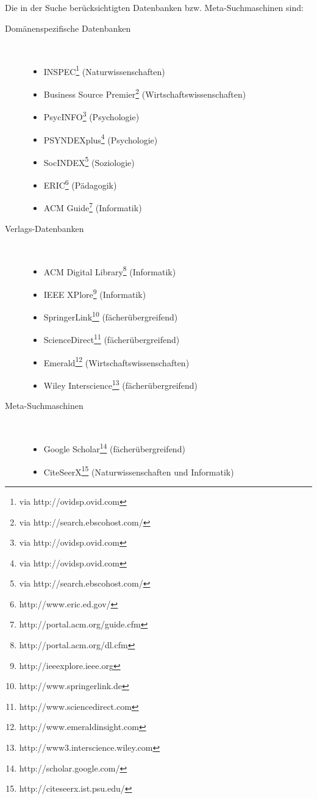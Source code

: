 Die in der Suche berücksichtigten Datenbanken bzw. Meta-Suchmaschinen sind:
\begin{description}
	\item[Domänenspezifische Datenbanken]\ 
		\begin{itemize}
			\item INSPEC\footnote{via http://ovidsp.ovid.com} (Naturwissenschaften)
			\item Business Source Premier\footnote{via http://search.ebscohost.com/} (Wirtschaftswissenschaften)
			\item PsycINFO\footnote{via http://ovidsp.ovid.com} (Psychologie)
			\item PSYNDEXplus\footnote{via http://ovidsp.ovid.com} (Psychologie)
			\item SocINDEX\footnote{via http://search.ebscohost.com/} (Soziologie)
			\item ERIC\footnote{http://www.eric.ed.gov/} (Pädagogik)
			\item ACM Guide\footnote{http://portal.acm.org/guide.cfm} (Informatik)
		\end{itemize}
	\item[Verlags-Datenbanken]\ 
		\begin{itemize}
			\item ACM Digital Library\footnote{http://portal.acm.org/dl.cfm} (Informatik)
			\item IEEE XPlore\footnote{http://ieeexplore.ieee.org} (Informatik)
			\item SpringerLink\footnote{http://www.springerlink.de} (fächerübergreifend)
			\item ScienceDirect\footnote{http://www.sciencedirect.com} (fächerübergreifend)
			\item Emerald\footnote{http://www.emeraldinsight.com} (Wirtschaftswissenschaften)
			\item Wiley Interscience\footnote{http://www3.interscience.wiley.com} (fächerübergreifend)
		\end{itemize}
	\item[Meta-Suchmaschinen]\ 
	 	\begin{itemize}
	 		\item Google Scholar\footnote{http://scholar.google.com/} (fächerübergreifend)
	 		\item CiteSeerX\footnote{http://citeseerx.ist.psu.edu/} (Naturwissenschaften und Informatik)
	 	\end{itemize}
\end{description}

